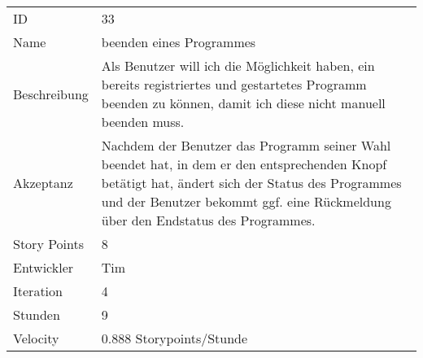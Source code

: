 \begin{table}[htbp]
\begin{minipage}{\linewidth}
\setlength{\tymax}{0.5\linewidth}
\centering
\small
\begin{tabulary}{\textwidth}{|l|p{10cm}|} \toprule
 ID   &33\\


Name  &beenden eines Programmes\\
Beschreibung&Als Benutzer will ich die Möglichkeit haben, ein bereits registriertes und gestartetes Programm beenden zu können, damit ich diese nicht manuell beenden muss.\\
Akzeptanz &Nachdem der Benutzer das Programm seiner Wahl beendet hat, in dem er den entsprechenden Knopf betätigt hat, ändert sich der Status des Programmes und der Benutzer bekommt ggf. eine Rückmeldung über den Endstatus des Programmes.\\
Story Points&8\\
Entwickler &Tim\\
Iteration &4\\
Stunden  &9\\
Velocity &0.888 Storypoints\slash Stunde\\
\bottomrule

\end{tabulary}
\end{minipage}
\end{table}



